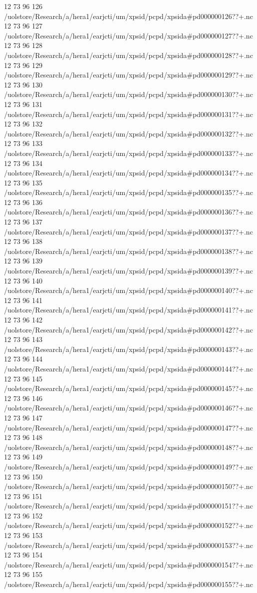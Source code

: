 12 73 96
126
/uolstore/Research/a/hera1/earjcti/um/xpsid/pcpd/xpsida#pd000000126??+.nc
12 73 96
127
/uolstore/Research/a/hera1/earjcti/um/xpsid/pcpd/xpsida#pd000000127??+.nc
12 73 96
128
/uolstore/Research/a/hera1/earjcti/um/xpsid/pcpd/xpsida#pd000000128??+.nc
12 73 96
129
/uolstore/Research/a/hera1/earjcti/um/xpsid/pcpd/xpsida#pd000000129??+.nc
12 73 96
130
/uolstore/Research/a/hera1/earjcti/um/xpsid/pcpd/xpsida#pd000000130??+.nc
12 73 96
131
/uolstore/Research/a/hera1/earjcti/um/xpsid/pcpd/xpsida#pd000000131??+.nc
12 73 96
132
/uolstore/Research/a/hera1/earjcti/um/xpsid/pcpd/xpsida#pd000000132??+.nc
12 73 96
133
/uolstore/Research/a/hera1/earjcti/um/xpsid/pcpd/xpsida#pd000000133??+.nc
12 73 96
134
/uolstore/Research/a/hera1/earjcti/um/xpsid/pcpd/xpsida#pd000000134??+.nc
12 73 96
135
/uolstore/Research/a/hera1/earjcti/um/xpsid/pcpd/xpsida#pd000000135??+.nc
12 73 96
136
/uolstore/Research/a/hera1/earjcti/um/xpsid/pcpd/xpsida#pd000000136??+.nc
12 73 96
137
/uolstore/Research/a/hera1/earjcti/um/xpsid/pcpd/xpsida#pd000000137??+.nc
12 73 96
138
/uolstore/Research/a/hera1/earjcti/um/xpsid/pcpd/xpsida#pd000000138??+.nc
12 73 96
139
/uolstore/Research/a/hera1/earjcti/um/xpsid/pcpd/xpsida#pd000000139??+.nc
12 73 96
140
/uolstore/Research/a/hera1/earjcti/um/xpsid/pcpd/xpsida#pd000000140??+.nc
12 73 96
141
/uolstore/Research/a/hera1/earjcti/um/xpsid/pcpd/xpsida#pd000000141??+.nc
12 73 96
142
/uolstore/Research/a/hera1/earjcti/um/xpsid/pcpd/xpsida#pd000000142??+.nc
12 73 96
143
/uolstore/Research/a/hera1/earjcti/um/xpsid/pcpd/xpsida#pd000000143??+.nc
12 73 96
144
/uolstore/Research/a/hera1/earjcti/um/xpsid/pcpd/xpsida#pd000000144??+.nc
12 73 96
145
/uolstore/Research/a/hera1/earjcti/um/xpsid/pcpd/xpsida#pd000000145??+.nc
12 73 96
146
/uolstore/Research/a/hera1/earjcti/um/xpsid/pcpd/xpsida#pd000000146??+.nc
12 73 96
147
/uolstore/Research/a/hera1/earjcti/um/xpsid/pcpd/xpsida#pd000000147??+.nc
12 73 96
148
/uolstore/Research/a/hera1/earjcti/um/xpsid/pcpd/xpsida#pd000000148??+.nc
12 73 96
149
/uolstore/Research/a/hera1/earjcti/um/xpsid/pcpd/xpsida#pd000000149??+.nc
12 73 96
150
/uolstore/Research/a/hera1/earjcti/um/xpsid/pcpd/xpsida#pd000000150??+.nc
12 73 96
151
/uolstore/Research/a/hera1/earjcti/um/xpsid/pcpd/xpsida#pd000000151??+.nc
12 73 96
152
/uolstore/Research/a/hera1/earjcti/um/xpsid/pcpd/xpsida#pd000000152??+.nc
12 73 96
153
/uolstore/Research/a/hera1/earjcti/um/xpsid/pcpd/xpsida#pd000000153??+.nc
12 73 96
154
/uolstore/Research/a/hera1/earjcti/um/xpsid/pcpd/xpsida#pd000000154??+.nc
12 73 96
155
/uolstore/Research/a/hera1/earjcti/um/xpsid/pcpd/xpsida#pd000000155??+.nc
